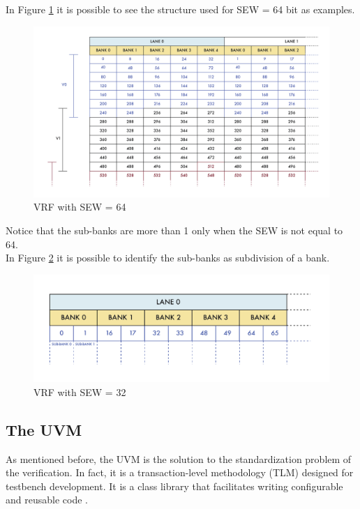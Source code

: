 In Figure \ref{vrf-64} it is possible to see the structure used for SEW = 64 bit as examples.
\begin{figure}[H]
    \centering
    \includegraphics[scale = 0.45]{Chapter_1/img/vrf-64.png}
    \caption{VRF with SEW = 64}
    \label{vrf-64}
\end{figure}

Notice that the sub-banks are more than 1 only when the SEW is not equal to 64. \\

In Figure \ref{vrf-32} it is possible to identify the sub-banks as subdivision of a bank.
\begin{figure}[H]
    \centering
    \includegraphics[scale = 0.7]{Chapter_1/img/vrf-32.png}
    \caption{VRF with SEW = 32}
    \label{vrf-32}
\end{figure}




\subsection{The UVM}
As mentioned before, the UVM is the solution to the standardization problem of the verification. In fact, it is a transaction-level methodology (TLM) designed for testbench development. It is a class library that facilitates writing configurable and reusable code \cite{verification-book-2018}.

